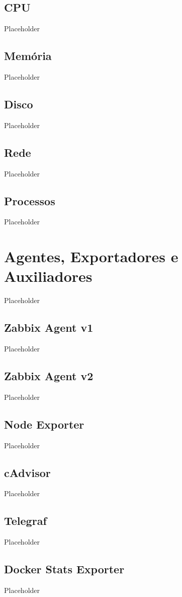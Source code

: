 \subsection{CPU}
Placeholder
\subsection{Memória}
Placeholder
\subsection{Disco}
Placeholder
\subsection{Rede}
Placeholder
\subsection{Processos}
Placeholder

\section{Agentes, Exportadores e Auxiliadores}
Placeholder

\subsection{Zabbix Agent v1}
Placeholder

\subsection{Zabbix Agent v2}
Placeholder

\subsection{Node Exporter}
Placeholder

\subsection{cAdvisor}
Placeholder

\subsection{Telegraf}
Placeholder

\subsection{Docker Stats Exporter}
Placeholder

